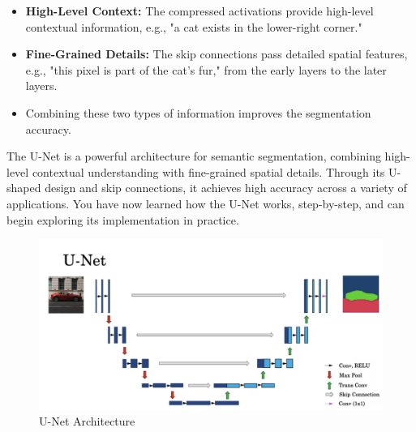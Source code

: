 \documentclass[letterpaper,12pt,notitlepage,twoside]{report}
\begin{document}
\begin{itemize}
    \item \textbf{High-Level Context:} The compressed activations provide high-level contextual information, e.g., "a cat exists in the lower-right corner."
    \item \textbf{Fine-Grained Details:} The skip connections pass detailed spatial features, e.g., "this pixel is part of the cat's fur," from the early layers to the later layers.
    \item Combining these two types of information improves the segmentation accuracy.
\end{itemize}

The U-Net is a powerful architecture for semantic segmentation, combining high-level contextual understanding with fine-grained spatial details. Through its U-shaped design and skip connections, it achieves high accuracy across a variety of applications. You have now learned how the U-Net works, step-by-step, and can begin exploring its implementation in practice.

\begin{figure}[h]
	\centering
	\includegraphics[width=\textwidth]{Images/U-Net.png}
	\caption{U-Net Architecture}
	\label{fig:51}
\end{figure}
\FloatBarrier
\end{document}
